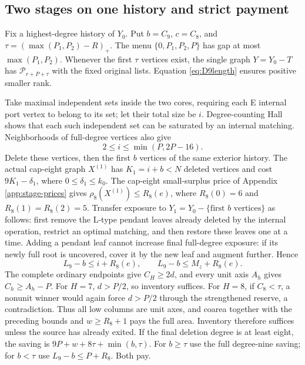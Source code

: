 \documentclass[11pt,a4paper]{article}
\newcommand{\p}{\mathcal P}
\theoremstyle{definition}
\begin{document}
\subsection{Two stages on one history and strict payment}
Fix a highest-degree history of $Y_0$. Put $b=C_9$, $c=C_8$, and
$\tau=(\max(P_1,P_2)-R)_+$.
The menu $\{0,P_1,P_2,P\}$ has gap at most $\max(P_1,P_2)$. Whenever the first $\tau$ vertices exist, the single graph
$Y=Y_0-T$ has $\p_{r+P+\tau}$ with the fixed original lists. Equation \eqref{eq:D9length} ensures positive smaller rank.

Take maximal independent sets inside the two cores, requiring each E internal port vertex to belong to its set; let their total size be $i$. Degree-counting Hall shows that each such independent set can be saturated by an internal matching. Neighborhoods of full-degree vertices also give
\[
2\le i\le\min(P,2P-16).
\]
Delete these vertices, then the first $b$ vertices of the same exterior history. The actual cap-eight graph $X^{(1)}$ has $K_1=i+b<N$ deleted vertices and cost $9K_1-\delta_1$, where $0\le\delta_1\le k_0$. The cap-eight small-surplus price of Appendix \ref{app:stage-prices} gives
$\rho_8(X^{(1)})\le R_8(e)$,
where $R_8(0)=6$ and $R_8(1)=R_8(2)=5$.
Transfer exposure to $Y_1=Y_0-\{\text{first }b\text{ vertices}\}$ as follows: first remove the L-type pendant leaves already deleted by the internal operation, restrict an optimal matching, and then restore these leaves one at a time. Adding a pendant leaf cannot increase final full-degree exposure: if its newly full root is uncovered, cover it by the new leaf and augment further. Hence
\[
L_9-b\le i+R_8(e),\qquad L_9-b\le M_z+R_8(e).
\]
The complete ordinary endpoints give $C_H\ge2d$, and every unit axis $A_h$ gives $C_h\ge A_h-P$.
For $H=7$, $d>P/2$, so inventory suffices. For $H=8$, if $C_8<\tau$, a nonunit winner would again force $d>P/2$ through the strengthened reserve, a contradiction. Thus all low columns are unit axes, and coarea together with the preceding bounds and $w\ge R_8+1$ pays the full area. Inventory therefore suffices unless the source has already exited. If the final deletion degree is at least eight, the saving is
$9P+w+8\tau+\min(b,\tau)$.
For $b\ge\tau$ use the full degree-nine saving; for $b<\tau$ use $L_9-b\le P+R_8$. Both pay.
\end{document}
